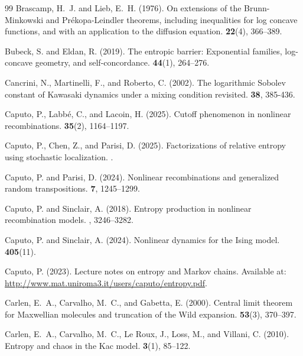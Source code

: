 \documentclass[11pt,reqno]{amsart}
\numberwithin{equation}{section}
\numberwithin{figure}{section}
\newcommand{\1}{\mathds{1}}
\begin{document}
\begin{thebibliography}{99}
Brascamp, H.~J. and Lieb, E.~H. (1976).
\newblock On extensions of the Brunn-Minkowski and Pr\'ekopa-Leindler theorems, including inequalities for log concave functions, and with an application to the diffusion equation.
 {\bf 22}(4), 366--389.

Bubeck, S. and Eldan, R. (2019).
\newblock The entropic barrier: Exponential families, log-concave geometry, and self-concordance.
 {\bf 44}(1), 264--276.

Cancrini, N., Martinelli, F., and Roberto, C. (2002). 
\newblock The logarithmic Sobolev constant of Kawasaki dynamics under a mixing condition revisited. 
 {\bf 38}, 385-436. 



Caputo, P., Labb\'e, C., and Lacoin, H. (2025).
\newblock Cutoff phenomenon in nonlinear recombinations.
 {\bf 35}(2), 1164--1197.

Caputo, P., Chen, Z., and Parisi, D. (2025).
\newblock Factorizations of relative entropy using stochastic localization.
.

Caputo, P. and Parisi, D. (2024).
\newblock Nonlinear recombinations and generalized random transpositions.
 {\bf 7}, 1245--1299.

Caputo, P. and Sinclair, A. (2018).
\newblock Entropy production in nonlinear recombination models.
, 3246--3282.

Caputo, P. and Sinclair, A. (2024).
\newblock Nonlinear dynamics for the Ising model.
 {\bf 405}(11).

Caputo, P. (2023).
\newblock Lecture notes on entropy and Markov chains.
\newblock Available at: \url{http://www.mat.uniroma3.it/users/caputo/entropy.pdf}.

Carlen, E.~A., Carvalho, M.~C., and Gabetta, E. (2000).
\newblock Central limit theorem for Maxwellian molecules and truncation of the Wild expansion.
 {\bf 53}(3), 370--397.

Carlen, E.~A., Carvalho, M.~C., Le Roux, J., Loss, M., and Villani, C. (2010).
\newblock Entropy and chaos in the Kac model.
 {\bf 3}(1), 85--122.


\end{thebibliography}
\end{document}
